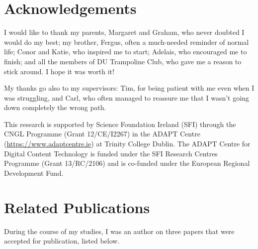 \documentclass[a4paper,12pt,leqno]{article}
\begin{document}
\newpage
\section*{Acknowledgements}

I would like to thank my parents, Margaret and Graham, who never doubted I would do my best; my brother, Fergus, often a much-needed reminder of normal life; Conor and Katie, who inspired me to start; Adelais, who encouraged me to finish; and all the members of DU Trampoline Club, who gave me a reason to stick around. I hope it was worth it!

My thanks go also to my supervisors: Tim, for being patient with me even when I was struggling, and Carl, who often managed to reassure me that I wasn't going down completely the wrong path.

This research is supported by Science Foundation Ireland (SFI) through the CNGL 
Programme (Grant 12/CE/I2267) in the ADAPT Centre 
(\url{https://www.adaptcentre.ie}) at Trinity College Dublin. The
ADAPT Centre for Digital Content Technology is funded under the SFI Research 
Centres Programme (Grant 13/RC/2106) and is co-funded under the European 
Regional Development Fund.


\newpage
\section*{Related Publications}
During the course of my studies, I was an author on three papers that were accepted for publication, listed below.
\end{document}
